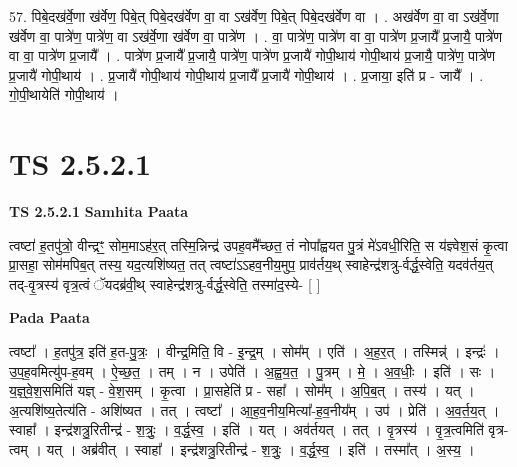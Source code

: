 \documentclass[17pt]{extarticle}
\begin{document}
57. पिबे॒दख॑र्वे॒णा ख॑र्वेण॒ पिबे॒त् पिबे॒दख॑र्वेण वा॒ वा ऽख॑र्वेण॒ पिबे॒त् पिबे॒दख॑र्वेण वा । . अख॑र्वेण वा॒ वा ऽख॑र्वे॒णा ख॑र्वेण वा॒ पात्रे॑ण॒ पात्रे॑ण॒ वा ऽख॑र्वे॒णा ख॑र्वेण वा॒ पात्रे॑ण । . वा॒ पात्रे॑ण॒ पात्रे॑ण वा वा॒ पात्रे॑ण प्र॒जायै᳚ प्र॒जायै॒ पात्रे॑ण वा वा॒ पात्रे॑ण प्र॒जायै᳚ । . पात्रे॑ण प्र॒जायै᳚ प्र॒जायै॒ पात्रे॑ण॒ पात्रे॑ण प्र॒जायै॑ गोपी॒थाय॑ गोपी॒थाय॑ प्र॒जायै॒ पात्रे॑ण॒ पात्रे॑ण प्र॒जायै॑ गोपी॒थाय॑ । . प्र॒जायै॑ गोपी॒थाय॑ गोपी॒थाय॑ प्र॒जायै᳚ प्र॒जायै॑ गोपी॒थाय॑ । . प्र॒जाया॒ इति॑ प्र - जायै᳚ । . गो॒पी॒थायेति॑ गोपी॒थाय॑ । \newline
\pagebreak
{}
\section*{ TS 2.5.2.1 }

\textbf{TS 2.5.2.1 } \newline
\textbf{Samhita Paata} \newline

त्वष्टा॑ ह॒तपु॑त्रो॒ वीन्द्रꣳ॒॒ सोम॒माऽह॑र॒त् तस्मि॒न्निन्द्र॑ उपह॒वमै᳚च्छत॒ तं नोपा᳚ह्वयत पु॒त्रं मे॑ऽवधी॒रिति॒ स य॑ज्ञ्वेश॒सं कृ॒त्वा प्रा॒सहा॒ सोम॑मपिब॒त् तस्य॒ यद॒त्यशि॑ष्यत॒ तत् त्वष्टा॑ऽऽहव॒नीय॒मुप॒ प्राव॑र्तय॒थ् स्वाहेन्द्र॑शत्रु-र्वर्द्ध॒स्वेति॒ यदव॑र्तय॒त् तद्-वृ॒त्रस्य॑ वृत्र॒त्वं ॅयदब्र॑वी॒थ् स्वाहेन्द्र॑शत्रु-र्वर्द्ध॒स्वेति॒ तस्मा॑द॒स्ये- [  ] \newline

\textbf{Pada Paata} \newline

त्वष्टा᳚ । ह॒तपु॑त्र॒ इति॑ ह॒त-पु॒त्रः॒ । वीन्द्र॒मिति॒ वि - इ॒न्द्र॒म् । सोम᳚म् । एति॑ । अ॒ह॒र॒त् । तस्मिन्न्॑ । इन्द्रः॑ । उ॒प॒ह॒वमित्यु॑प-ह॒वम् । ऐ॒च्छ॒त॒ । तम् । न । उपेति॑ । अ॒ह्व॒य॒त॒ । पु॒त्रम् । मे॒ । अ॒व॒धीः॒ । इति॑ । सः । य॒ज्ञ्॒वे॒श॒समिति॑ यज्ञ् - वे॒श॒सम् । कृ॒त्वा । प्रा॒सहेति॑ प्र - सहा᳚ । सोम᳚म् । अ॒पि॒ब॒त् । तस्य॑ । यत् । अ॒त्यशि॑ष्य॒तेत्य॑ति - अशि॑ष्यत । तत् । त्वष्टा᳚ । आ॒ह॒व॒नीय॒मित्या᳚-ह॒व॒नीय᳚म् । उप॑ । प्रेति॑ । अ॒व॒र्त॒य॒त् । स्वाहा᳚ । इन्द्र॑शत्रु॒रितीन्द्र॑ - श॒त्रुः॒ । व॒र्द्ध॒स्व॒ । इति॑ । यत् । अव॑र्तयत् । तत् । वृ॒त्रस्य॑ । वृ॒त्र॒त्वमिति॑ वृत्र-त्वम् । यत् । अब्र॑वीत् । स्वाहा᳚ । इन्द्र॑शत्रु॒रितीन्द्र॑ - श॒त्रुः॒ । व॒र्द्ध॒स्व॒ । इति॑ । तस्मा᳚त् । अ॒स्य॒ ।  \newline
\end{document}
